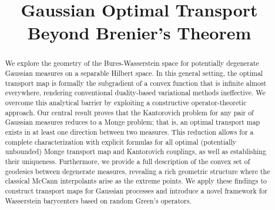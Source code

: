 \documentclass[noinfoline]{imsart}\setcounter{tocdepth}{2}
\theoremstyle{plain}
\begin{document}
\pagestyle{fancy}
\fancyhead{}
\renewcommand{\headrulewidth}{0pt} %

\begin{frontmatter}
\title{{\large Gaussian Optimal Transport Beyond Brenier's Theorem}}


\begin{abstract}
We explore the geometry of the Bures-Wasserstein space for potentially degenerate Gaussian measures on a separable Hilbert space. In this general setting, the optimal transport map is formally the subgradient of a convex function that is infinite almost everywhere, rendering conventional duality-based variational methods ineffective. We overcome this analytical barrier by exploiting a constructive operator-theoretic approach. Our central result proves that the Kantorovich problem for any pair of Gaussian measures reduces to a Monge problem; that is, an optimal transport map exists in at least one direction between two measures. This reduction allows for a complete characterization with explicit formulas for all optimal (potentially unbounded) Monge transport map and Kantorovich couplings, as well as establishing their uniqueness. Furthermore, we provide a full description of the convex set of geodesics between degenerate measures, revealing a rich geometric structure where the classical McCann interpolants arise as the extreme points. We apply these findings to construct transport maps for Gaussian processes and introduce a novel framework for Wasserstein barycenters based on random Green's operators.
\end{abstract}

\begin{keyword}[class=AMS]
\end{keyword}

\begin{keyword}
\end{keyword}
\end{frontmatter}
\end{document}
